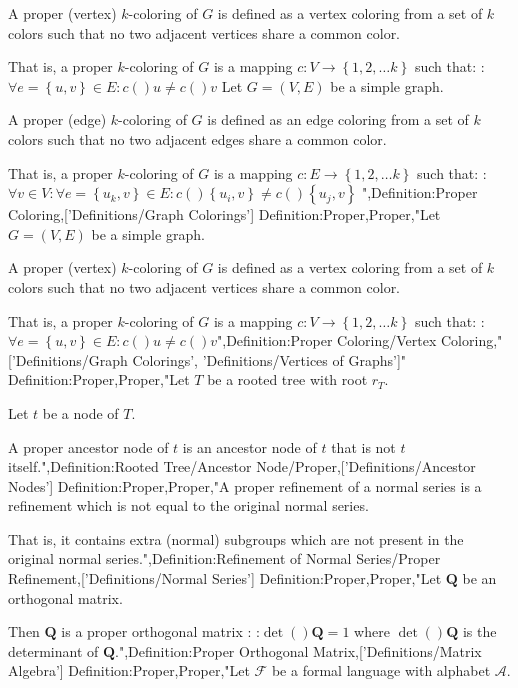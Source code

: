 A proper (vertex) $k$-coloring of $G$ is defined as a vertex coloring from a set of $k$ colors such that no two adjacent vertices share a common color.

That is, a proper $k$-coloring of $G$ is a mapping $c: V \to \left\lbrace 1, 2, \ldots k \right\rbrace$ such that:
:$\forall e = \left\lbrace u, v \right\rbrace \in E: c \left(   \right)u \ne c \left(   \right)v$
Let $G = \left( V, E \right)$ be a simple graph.


A proper (edge) $k$-coloring of $G$ is defined as an edge coloring from a set of $k$ colors such that no two adjacent edges share a common color.

That is, a proper $k$-coloring of $G$ is a mapping $c: E \to \left\lbrace 1, 2, \ldots k \right\rbrace$ such that:
:$\forall v \in V: \forall e = \left\lbrace u_k, v \right\rbrace \in E: c \left(   \right){\left\lbrace u_i, v \right\rbrace } \ne c \left(   \right){\left\lbrace u_j, v \right\rbrace }$
",Definition:Proper Coloring,['Definitions/Graph Colorings']
Definition:Proper,Proper,"Let $G = \left( V, E \right)$ be a simple graph.


A proper (vertex) $k$-coloring of $G$ is defined as a vertex coloring from a set of $k$ colors such that no two adjacent vertices share a common color.

That is, a proper $k$-coloring of $G$ is a mapping $c: V \to \left\lbrace 1, 2, \ldots k \right\rbrace$ such that:
:$\forall e = \left\lbrace u, v \right\rbrace \in E: c \left(   \right)u \ne c \left(   \right)v$",Definition:Proper Coloring/Vertex Coloring,"['Definitions/Graph Colorings', 'Definitions/Vertices of Graphs']"
Definition:Proper,Proper,"Let $T$ be a rooted tree with root $r_T$.

Let $t$ be a node of $T$.


A proper ancestor node of $t$ is an ancestor node of $t$ that is not $t$ itself.",Definition:Rooted Tree/Ancestor Node/Proper,['Definitions/Ancestor Nodes']
Definition:Proper,Proper,"A proper refinement of a normal series is a refinement which is not equal to the original normal series.


That is, it contains extra (normal) subgroups which are not present in the original normal series.",Definition:Refinement of Normal Series/Proper Refinement,['Definitions/Normal Series']
Definition:Proper,Proper,"Let $\mathbf Q$ be an orthogonal matrix.


Then $\mathbf Q$ is a proper orthogonal matrix :
:$\det \left(   \right){\mathbf Q} = 1$
where $\det \left(   \right){\mathbf Q}$ is the determinant of $\mathbf Q$.",Definition:Proper Orthogonal Matrix,['Definitions/Matrix Algebra']
Definition:Proper,Proper,"Let $\mathcal F$ be a formal language with alphabet $\mathcal A$.

